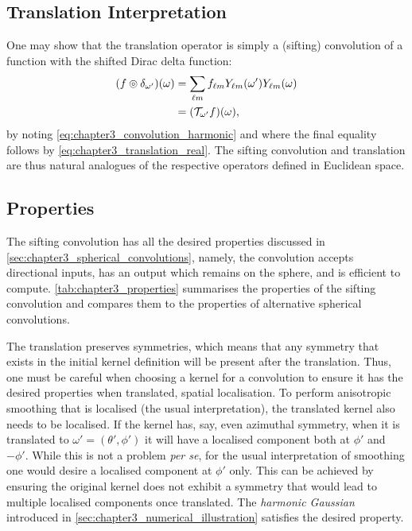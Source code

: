 \subsection{Translation Interpretation}\label{sec:chapter3_translation_interpretation}

One may show that the translation operator is simply a (sifting) convolution of a function with the shifted Dirac delta function:
%
\begin{align}
	\pixel{\convolution{f}{\delta_{\omega'}}}
	 & = \harmonicSum \harmonic{f} \pixel[']{\harmonic{Y}} \pixel{\harmonic{Y}} \nonumber{} \\
	 & = \pixel{(\translation{\omega'}f)},
\end{align}
%
by noting \cref{eq:chapter3_convolution_harmonic} and where the final equality follows by \cref{eq:chapter3_translation_real}.
The sifting convolution and translation are thus natural analogues of the respective operators defined in Euclidean space.

\subsection{Properties}\label{sec:chapter3_properties}

The sifting convolution has all the desired properties discussed in \cref{sec:chapter3_spherical_convolutions}, namely, the convolution accepts directional inputs, has an output which remains on the sphere, and is efficient to compute.
\cref{tab:chapter3_properties} summarises the properties of the sifting convolution and compares them to the properties of alternative spherical convolutions.

The translation preserves symmetries, which means that any symmetry that exists in the initial kernel definition will be present after the translation.
Thus, one must be careful when choosing a kernel for a convolution to ensure it has the desired properties when translated, \eg{} spatial localisation.
To perform anisotropic smoothing that is localised (the usual interpretation), the translated kernel also needs to be localised.
If the kernel has, say, even azimuthal symmetry, when it is translated to \(\omega'=(\theta', \phi')\) it will have a localised component both at \(\phi'\) and \(-\phi'\).
While this is not a problem \emph{per se}, for the usual interpretation of smoothing one would desire a localised component at \(\phi'\) only.
This can be achieved by ensuring the original kernel does not exhibit a symmetry that would lead to multiple localised components once translated.
The \emph{harmonic Gaussian} introduced in \cref{sec:chapter3_numerical_illustration} satisfies the desired property.

